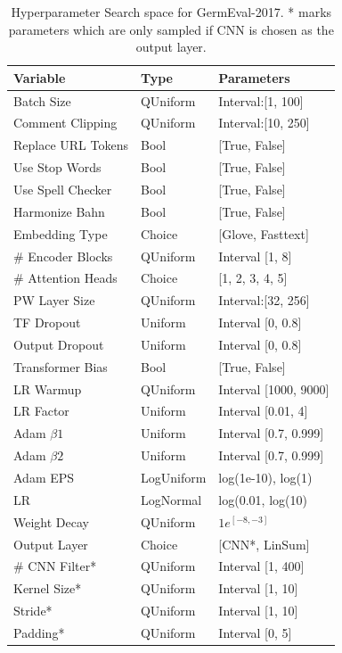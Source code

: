 \begin{table}[H]
	\centering
	\begin{tabular}{@{}lll@{}}
	\toprule
	Variable           & Type       & Parameters                \\ \midrule
	Batch Size         & QUniform   & Interval:{[}1, 100{]}    \\
	Comment Clipping   & QUniform   & Interval:{[}10, 250{]}   \\
	Replace URL Tokens & Bool       & {[}True, False{]}         \\
	Use Stop Words     & Bool       & {[}True, False{]}         \\
	Use Spell Checker  & Bool       & {[}True, False{]}         \\
	Harmonize Bahn     & Bool       & {[}True, False{]}         \\
	Embedding Type     & Choice     & {[}Glove, Fasttext{]}     \\
	\# Encoder Blocks  & QUniform   & Interval {[}1, 8{]}       \\
	\# Attention Heads & Choice     & {[}1, 2, 3, 4, 5{]}       \\
	PW Layer Size      & QUniform   & Interval:{[}32, 256{]}   \\
	TF Dropout         & Uniform    & Interval {[}0, 0.8{]}     \\
	Output Dropout     & Uniform    & Interval {[}0, 0.8{]}     \\
	Transformer Bias   & Bool       & {[}True, False{]}         \\
	LR Warmup          & QUniform   & Interval {[}1000, 9000{]} \\
	LR Factor          & Uniform    & Interval {[}0.01, 4{]}    \\
	Adam $\beta 1$        & Uniform    & Interval {[}0.7, 0.999{]} \\
	Adam $\beta 2$        & Uniform    & Interval {[}0.7, 0.999{]} \\
	Adam EPS           & LogUniform & log(1e-10), log(1)        \\
	LR                 & LogNormal  & log(0.01, log(10)         \\
	Weight Decay       & QUniform   & $1e^{[-8, -3]}$       \\
	Output Layer       & Choice     & {[}CNN*, LinSum{]}        \\
	\# CNN Filter*     & QUniform   & Interval {[}1, 400{]}     \\
	Kernel Size*       & QUniform   & Interval {[}1, 10{]}      \\
	Stride*            & QUniform   & Interval {[}1, 10{]}      \\
	Padding*           & QUniform   & Interval {[}0, 5{]}       \\ \bottomrule
	\end{tabular}
	\caption{Hyperparameter Search space for GermEval-2017. * marks parameters which are only sampled if CNN is chosen as the output layer.}
	\label{tab:08_hpSpace}	
\end{table}

